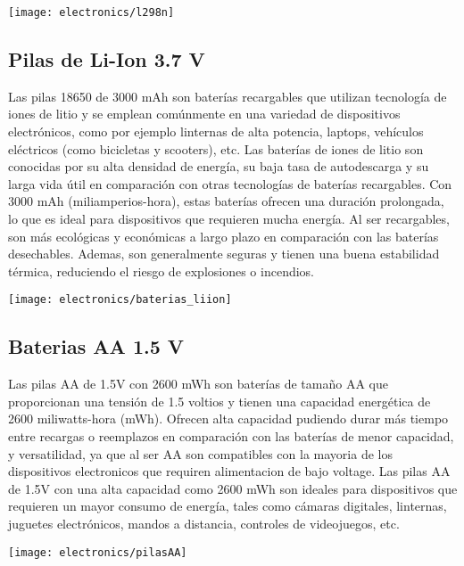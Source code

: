 \begin{center}
    \centering
    \texttt{[image: electronics/l298n]}
    \label{fig:l298n}
\end{center}

\subsection{Pilas de Li-Ion 3.7 V}
Las pilas 18650 de 3000 mAh son baterías recargables que utilizan tecnología de iones de litio y se emplean comúnmente en una variedad de dispositivos electrónicos, como por ejemplo linternas de alta potencia, laptops, vehículos eléctricos (como bicicletas y scooters), etc. Las baterías de iones de litio son conocidas por su alta densidad de energía, su baja tasa de autodescarga y su larga vida útil en comparación con otras tecnologías de baterías recargables. Con 3000 mAh (miliamperios-hora), estas baterías ofrecen una duración prolongada, lo que es ideal para dispositivos que requieren mucha energía. Al ser recargables, son más ecológicas y económicas a largo plazo en comparación con las baterías desechables. Ademas, son generalmente seguras y tienen una buena estabilidad térmica, reduciendo el riesgo de explosiones o incendios.

\begin{center}
    \centering
    \texttt{[image: electronics/baterias\_liion]}
    \label{fig:baterias_liion}
\end{center}

\subsection{Baterias AA 1.5 V}

Las pilas AA de 1.5V con 2600 mWh son baterías de tamaño AA que proporcionan una tensión de 1.5 voltios y tienen una capacidad energética de 2600 miliwatts-hora (mWh). Ofrecen alta capacidad  pudiendo durar más tiempo entre recargas o reemplazos en comparación con las baterías de menor capacidad, y versatilidad, ya que al ser AA son compatibles con la mayoria de los dispositivos electronicos que requiren alimentacion de bajo voltage.
Las pilas AA de 1.5V con una alta capacidad como 2600 mWh son ideales para dispositivos que requieren un mayor consumo de energía, tales como cámaras digitales, linternas, juguetes electrónicos, mandos a distancia, controles de videojuegos, etc.
\begin{center}
    \centering
    \texttt{[image: electronics/pilasAA]}
    \label{fig:pilasAA}
\end{center}


